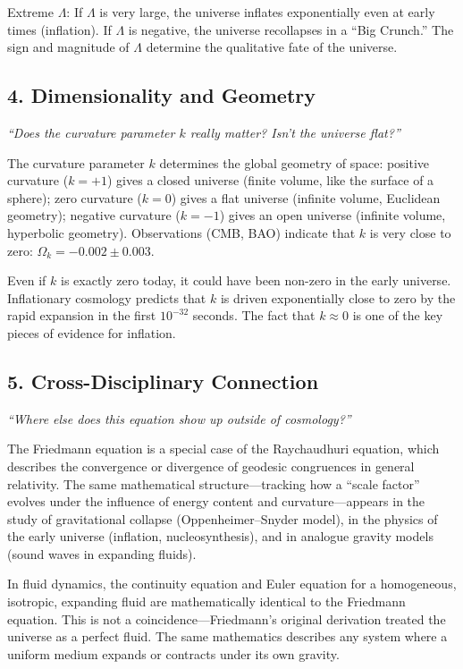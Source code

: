 \documentclass[11pt,openright]{book}
\begin{document}
Extreme $\Lambda$: If $\Lambda$ is very large, the universe inflates exponentially even at early times (inflation). If $\Lambda$ is negative, the universe recollapses in a ``Big Crunch.'' The sign and magnitude of $\Lambda$ determine the qualitative fate of the universe.

\subsection*{4. Dimensionality and Geometry}
\textit{``Does the curvature parameter $k$ really matter? Isn't the universe flat?''}

The curvature parameter $k$ determines the global geometry of space: positive curvature ($k = +1$) gives a closed universe (finite volume, like the surface of a sphere); zero curvature ($k = 0$) gives a flat universe (infinite volume, Euclidean geometry); negative curvature ($k = -1$) gives an open universe (infinite volume, hyperbolic geometry). Observations (CMB, BAO) indicate that $k$ is very close to zero: $\Omega_k = -0.002 \pm 0.003$.

Even if $k$ is exactly zero today, it could have been non-zero in the early universe. Inflationary cosmology predicts that $k$ is driven exponentially close to zero by the rapid expansion in the first $10^{-32}$ seconds. The fact that $k \approx 0$ is one of the key pieces of evidence for inflation.

\subsection*{5. Cross-Disciplinary Connection}
\textit{``Where else does this equation show up outside of cosmology?''}

The Friedmann equation is a special case of the Raychaudhuri equation, which describes the convergence or divergence of geodesic congruences in general relativity. The same mathematical structure---tracking how a ``scale factor'' evolves under the influence of energy content and curvature---appears in the study of gravitational collapse (Oppenheimer--Snyder model), in the physics of the early universe (inflation, nucleosynthesis), and in analogue gravity models (sound waves in expanding fluids).

In fluid dynamics, the continuity equation and Euler equation for a homogeneous, isotropic, expanding fluid are mathematically identical to the Friedmann equation. This is not a coincidence---Friedmann's original derivation treated the universe as a perfect fluid. The same mathematics describes any system where a uniform medium expands or contracts under its own gravity.
\end{document}
